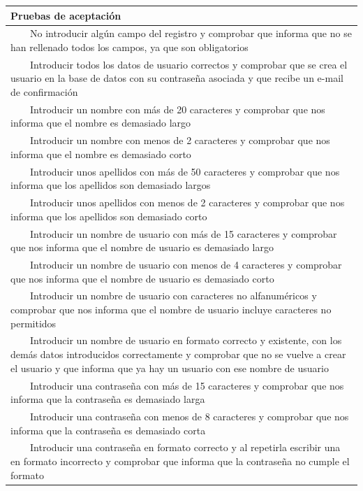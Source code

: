 \documentclass[11pt]{article}
\newcommand{\tabitem}{~~\llap{\textbullet}~~}
\begin{document}
  \begin{longtable}{p{1.028\linewidth}}
    \textbf{Pruebas de aceptación}\\
  \midrule
  \tabitem No introducir algún campo del registro y comprobar que informa que no se han rellenado todos los campos, ya que son obligatorios\\
  \tabitem Introducir todos los datos de usuario correctos y comprobar que se crea el usuario en la base de datos con su contraseña asociada y que recibe un e-mail de confirmación\\
  \tabitem Introducir un nombre con más de 20 caracteres y comprobar que nos informa que el nombre es demasiado largo\\
  \tabitem Introducir un nombre con menos de 2 caracteres y comprobar que nos informa que el nombre es demasiado corto\\
  \tabitem Introducir unos apellidos con más de 50 caracteres y comprobar que nos informa que los apellidos son demasiado largos\\
  \tabitem Introducir unos apellidos con menos de 2 caracteres y comprobar que nos informa que los apellidos son demasiado corto\\
  \tabitem Introducir un nombre de usuario con más de 15 caracteres y comprobar que nos informa que el nombre de usuario es demasiado largo\\
  \tabitem Introducir un nombre de usuario con menos de 4 caracteres y comprobar que nos informa que el nombre de usuario es demasiado corto\\
  \tabitem Introducir un nombre de usuario con caracteres no alfanuméricos y comprobar que nos informa que el nombre de usuario incluye caracteres no permitidos\\
  \tabitem Introducir un nombre de usuario en formato correcto y existente, con los demás datos introducidos correctamente y comprobar que no se vuelve a crear el usuario y que informa que ya hay un usuario con ese nombre de usuario\\
  \tabitem Introducir una contraseña con más de 15 caracteres y comprobar que nos informa que la contraseña es demasiado larga\\
  \tabitem Introducir una contraseña con menos de  8 caracteres y comprobar que nos informa que la contraseña es demasiado corta\\
  \tabitem Introducir una contraseña en formato correcto y al repetirla escribir una en formato incorrecto y comprobar que informa que la contraseña no cumple el formato\\

\end{longtable}
\end{document}
